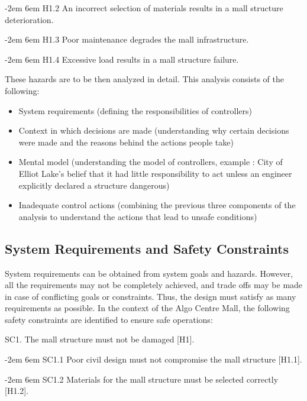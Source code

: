 \documentclass[12pt]{article}
\begin{document}
{\parindent -2em
\leftskip 6em 
H1.2 An incorrect selection of materials results in a mall structure deterioration.

}

{\parindent -2em
\leftskip 6em 
H1.3 Poor maintenance degrades the mall infrastructure.

}

{\parindent -2em
\leftskip 6em 
H1.4 Excessive load results in a mall structure failure.

}

These hazards are to be then analyzed in detail. This analysis consists of the following: 

\begin{itemize}
    \item System requirements (defining the responsibilities of controllers)
    \item Context in which decisions are made (understanding why certain decisions were made and the reasons behind the actions people take)
    \item Mental model (understanding the model of controllers, example : City of Elliot Lake's belief that it had little responsibility to act unless an engineer explicitly declared a structure dangerous)
    \item Inadequate control actions (combining the previous three components of the analysis to understand the actions that lead to unsafe conditions)
\end{itemize}

\subsection{System Requirements and Safety Constraints}

System requirements can be obtained from system goals and hazards. However, all the requirements may not be completely achieved, and trade offs may be made in case of conflicting goals or constraints. Thus, the design must satisfy as many requirements as possible. In the context of the Algo Centre Mall, the following safety constraints are identified to ensure safe operations:

SC1. The mall structure must not be damaged [H1].

{\parindent -2em
\leftskip 6em 
SC1.1 Poor civil design must not compromise the mall structure [H1.1].

}

{\parindent -2em
\leftskip 6em 
SC1.2 Materials for the mall structure must be selected correctly [H1.2].

}
\end{document}
